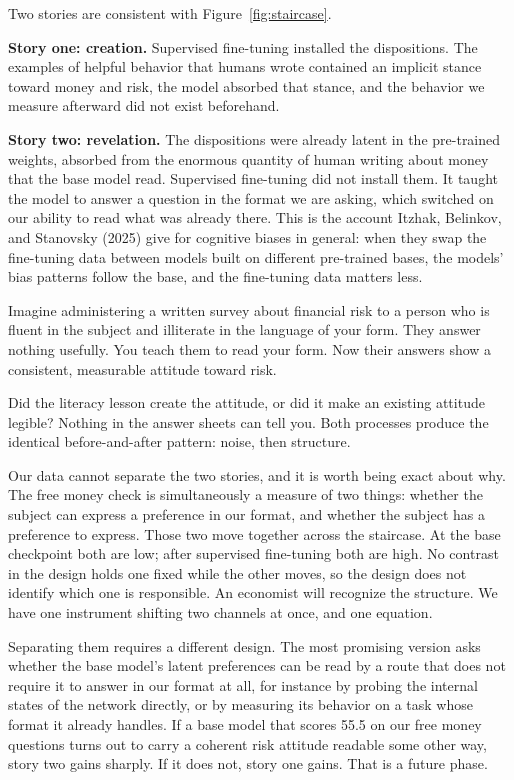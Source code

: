 \documentclass[11pt]{article}
\begin{document}
Two stories are consistent with Figure~\ref{fig:staircase}.

\textbf{Story one: creation.} Supervised fine-tuning installed the dispositions. The examples of
helpful behavior that humans wrote contained an implicit stance toward money and risk, the
model absorbed that stance, and the behavior we measure afterward did not exist beforehand.

\textbf{Story two: revelation.} The dispositions were already latent in the pre-trained weights,
absorbed from the enormous quantity of human writing about money that the base model read.
Supervised fine-tuning did not install them. It taught the model to answer a question in the
format we are asking, which switched on our ability to read what was already there. This is the
account Itzhak, Belinkov, and Stanovsky (2025) give for cognitive biases in general: when they swap
the fine-tuning data between models built on different pre-trained bases, the models' bias
patterns follow the base, and the fine-tuning data matters less.

\begin{keybox}
Imagine administering a written survey about financial risk to a person who is fluent in the
subject and illiterate in the language of your form. They answer nothing usefully. You teach them
to read your form. Now their answers show a consistent, measurable attitude toward risk.

Did the literacy lesson create the attitude, or did it make an existing attitude legible? Nothing
in the answer sheets can tell you. Both processes produce the identical before-and-after pattern:
noise, then structure.
\end{keybox}

Our data cannot separate the two stories, and it is worth being exact about why. The free money
check is simultaneously a measure of two things: whether the subject can express a preference in
our format, and whether the subject has a preference to express. Those two move together across
the staircase. At the base checkpoint both are low; after supervised fine-tuning both are high.
No contrast in the design holds one fixed while the other moves, so the design does not identify
which one is responsible. An economist will recognize the structure. We have one instrument
shifting two channels at once, and one equation.

Separating them requires a different design. The most promising version asks whether the base
model's latent preferences can be read by a route that does not require it to answer in our
format at all, for instance by probing the internal states of the network directly, or by
measuring its behavior on a task whose format it already handles. If a base model that scores
55.5 on our free money questions turns out to carry a coherent risk attitude readable some other
way, story two gains sharply. If it does not, story one gains. That is a future phase.
\end{document}
